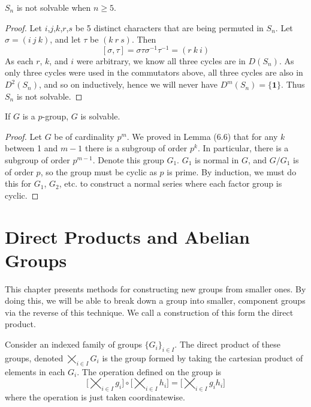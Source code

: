 \begin{theorem}
    $S_n$ is not solvable when $n \geq 5$.
\end{theorem}
\begin{proof}
    Let $i$,$j$,$k$,$r$,$s$ be 5 distinct characters that are being permuted in $S_n$. Let $\sigma = (i\ j\ k)$, and let $\tau$ be $(k\ r\ s)$. Then
    \[ [\sigma, \tau] = \sigma\tau\sigma^{-1}\tau^{-1} = (r\ k\ i) \]
    As each $r$, $k$, and $i$ were arbitrary, we know all three cycles are in $D(S_n)$. As only three cycles were used in the commutators above, all three cycles are also in $D^2(S_n)$, and so on inductively, hence we will never have $D^m(S_n) = \{ \mathbf{1} \}$. Thus $S_n$ is not solvable.
\end{proof}

\begin{theorem}
    If $G$ is a $p$-group, $G$ is solvable.
\end{theorem}
\begin{proof}
    Let $G$ be of cardinality $p^m$. We proved in Lemma (6.6) that for any $k$ between 1 and $m-1$ there is a subgroup of order $p^k$. In particular, there is a subgroup of order $p^{m-1}$. Denote this group $G_1$. $G_1$ is normal in $G$, and $G/G_1$ is of order $p$, so the group must be cyclic as $p$ is prime. By induction, we must do this for $G_1$, $G_2$, etc. to construct a normal series where each factor group is cyclic.
\end{proof}





\chapter{Direct Products and Abelian Groups}

This chapter presents methods for constructing new groups from smaller ones. By doing this, we will be able to break down a group into smaller, component groups via the reverse of this technique. We call a construction of this form the direct product.

\begin{definition}
Consider an indexed family of groups $\{ G_i \}_{i \in I}$. The direct product of these groups, denoted $\bigtimes_{i \in I} G_i$ is the group formed by taking the cartesian product of elements in each $G_i$. The operation defined on the group is
%
\[ \bigg[ \bigtimes_{i \in I} g_i \bigg] \circ \bigg[ \bigtimes_{i \in I} h_i \bigg] = \bigg[ \bigtimes_{i \in I} g_ih_i \bigg] \]
%
where the operation is just taken coordinatewise.
\end{definition}

